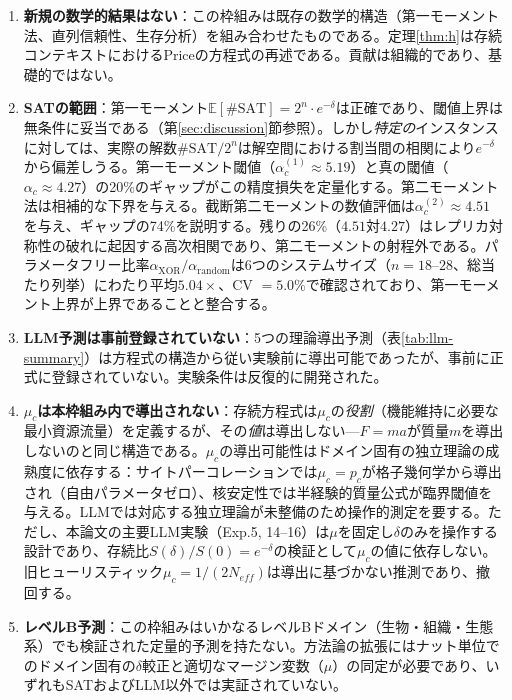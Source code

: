 \documentclass[11pt,a4paper]{article}
\begin{document}
\begin{enumerate}
    \item \textbf{新規の数学的結果はない}：この枠組みは既存の数学的構造（第一モーメント法、直列信頼性、生存分析）を組み合わせたものである。定理\ref{thm:h}は存続コンテキストにおけるPriceの方程式の再述である。貢献は組織的であり、基礎的ではない。

    \item \textbf{SATの範囲}：第一モーメント$\mathbb{E}[\#\text{SAT}] = 2^n \cdot e^{-\delta}$は正確であり、閾値上界は無条件に妥当である（第\ref{sec:discussion}節参照）。しかし\emph{特定の}インスタンスに対しては、実際の解数$\#\text{SAT}/2^n$は解空間における割当間の相関により$e^{-\delta}$から偏差しうる。第一モーメント閾値（$\alpha_c^{(1)} \approx 5.19$）と真の閾値（$\alpha_c \approx 4.27$）の20\%のギャップがこの精度損失を定量化する。第二モーメント法は相補的な下界を与える。截断第二モーメントの数値評価は$\alpha_c^{(2)} \approx 4.51$を与え、ギャップの74\%を説明する。残りの26\%（$4.51$対$4.27$）はレプリカ対称性の破れに起因する高次相関であり、第二モーメントの射程外である。パラメータフリー比率$\alpha_{\text{XOR}}/\alpha_{\text{random}}$は6つのシステムサイズ（$n = 18$--$28$、総当たり列挙）にわたり平均$5.04\times$、CV $= 5.0\%$で確認されており、第一モーメント上界が上界であることと整合する。

    \item \textbf{LLM予測は事前登録されていない}：5つの理論導出予測（表\ref{tab:llm-summary}）は方程式の構造から従い実験前に導出可能であったが、事前に正式に登録されていない。実験条件は反復的に開発された。

    \item \textbf{$\mu_c$は本枠組み内で導出されない}：存続方程式は$\mu_c$の\emph{役割}（機能維持に必要な最小資源流量）を定義するが、その\emph{値}は導出しない---$F = ma$が質量$m$を導出しないのと同じ構造である。$\mu_c$の導出可能性はドメイン固有の独立理論の成熟度に依存する：サイトパーコレーションでは$\mu_c = p_c$が格子幾何学から導出され（自由パラメータゼロ）、核安定性では半経験的質量公式が臨界閾値を与える。LLMでは対応する独立理論が未整備のため操作的測定を要する。ただし、本論文の主要LLM実験（Exp.5, 14--16）は$\mu$を固定し$\delta$のみを操作する設計であり、存続比$S(\delta)/S(0) = e^{-\delta}$の検証として$\mu_c$の値に依存しない。旧ヒューリスティック$\mu_c = 1/(2 N_{eff})$は導出に基づかない推測であり、撤回する。

    \item \textbf{レベルB予測}：この枠組みはいかなるレベルBドメイン（生物・組織・生態系）でも検証された定量的予測を持たない。方法論の拡張にはナット単位でのドメイン固有の$\delta$較正と適切なマージン変数（$\mu$）の同定が必要であり、いずれもSATおよびLLM以外では実証されていない。


\end{enumerate}
\end{document}
